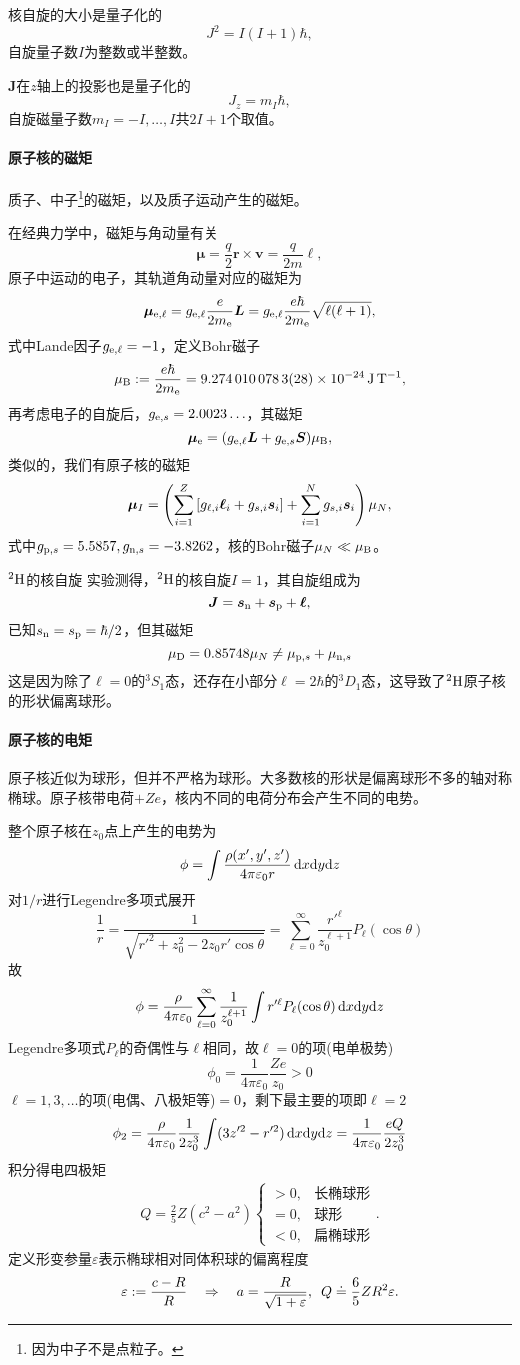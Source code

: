 核自旋的大小是量子化的
\[
	J^2=I(I+1)\hbar,
\]
自旋量子数$I$为整数或半整数。

$\bm J$在$z$轴上的投影也是量子化的
\[
	J_z=m_I\hbar,
\]
自旋磁量子数$m_I=-I,\ldots,I$共$2I+1$个取值。
\paragraph{原子核的磁矩}质子、中子\footnote{因为中子不是点粒子。}的磁矩，以及质子运动产生的磁矩。

在经典力学中，磁矩与角动量有关
\[
	\bm\mu=\frac{q}2\bm r\times\bm v=\frac{q}{2m}\bm\ell,
\]
原子中运动的电子，其轨道角动量对应的磁矩为
\[
	\bm\mu_{\elc,\ell}=g_{\elc,\ell}\frac{e}{2m_\elc}\bm L=g_{\elc,\ell}\frac{e\hbar}{2m_\elc}\sqrt{\ell(\ell+1)},
\]
式中Lande因子$g_{\elc,\ell}=-1$，定义Bohr磁子
\[
	\muB:=\frac{e\hbar}{2m_\elc}=\SI[separate-uncertainty = false]{9.2740100783(28)e-24}{J.T^{-1}},
\]
再考虑电子的自旋后，$g_{\elc,s}=2.0023\ldots$，其磁矩
\[
	\bm\mu_\elc=(g_{\elc,\ell}\bm L+g_{\elc,s}\bm S)\muB,
\]
类似的，我们有原子核的磁矩
\[
	\bm\mu_I=\kh{\sum_{i=1}^Z\fkh{g_{\ell,i}\bm\ell_i+g_{s,i}\bm s_i}+\sum_{i=1}^Ng_{s,i}\bm s_i}\mu_N,
\]
式中$g_{\pton,s}=5.5857,g_{\nton,s}=-3.8262$，核的Bohr磁子$\mu_N\ll\muB$。
\begin{example}{$\nucli2H$的核自旋}{}
	实验测得，$\nucli2H$的核自旋$I=1$，其自旋组成为
	\[
		\bm J=\bm s_\nton+\bm s_\pton+\bm\ell,
	\]
	已知$s_\nton=s_\pton=\hbar/2$，但其磁矩
	\[
		\mu_{\nuc D}=0.85748\mu_N\neq\mu_{\pton,s}+\mu_{\nton,s}
	\]
	这是因为除了$\ell=0$的$^3S_1$态，还存在小部分$\ell=2\hbar$的$^3D_1$态，这导致了$\nucli2H$原子核的形状偏离球形。
\end{example}
\paragraph{原子核的电矩}原子核近似为球形，但并不严格为球形。大多数核的形状是偏离球形不多的轴对称椭球。原子核带电荷$+Ze$，核内不同的电荷分布会产生不同的电势。

整个原子核在$z_0$点上产生的电势为
\[
	\phi=\int\frac{\rho(x',y',z')}{4\pi\varepsilon_0r}\d x\nd y\nd z
\]
对$1/r$进行Legendre多项式展开
\[
	\frac1r=\frac1{\sqrt{r'^2+z_0^2-2z_0r'\cos\theta}}=\sum_{\ell=0}^\infty \frac{r'^\ell}{z_0^{\ell+1}}P_\ell(\cos\theta)
\]
故
\[
	\phi=\frac\rho{4\pi\varepsilon_0}\sum_{\ell=0}^\infty\frac1{z_0^{\ell+1}}\int r'^\ell P_\ell(\cos\theta)\d x\nd y\nd z
\]
Legendre多项式$P_\ell$的奇偶性与$\ell$相同，故$\ell=0$的项(电单极势)
\[
	\phi_0=\frac1{4\pi\varepsilon_0}\frac{Ze}{z_0}>0
\]
$\ell=1,3,\ldots$的项(电偶、八极矩等)$=0$，剩下最主要的项即$\ell=2$
\[
	\phi_2=\frac\rho{4\pi\varepsilon_0}\frac1{2z_0^3}\int(3z'^2-r'^2)\d x\nd y\nd z=\frac1{4\pi\varepsilon_0}\frac{eQ}{2z_0^3}
\]
积分得电四极矩
\begin{align}
	Q=\frac25Z(c^2-a^2)\begin{cases}
		>0,&\text{长椭球形}\\
		=0,&\text{球形}\\
		<0,&\text{扁椭球形}
	\end{cases}.
\end{align}
定义形变参量$\varepsilon$表示椭球相对同体积球的偏离程度
\[
	\varepsilon:=\frac{c-R}R\thus a=\frac{R}{\sqrt{1+\varepsilon}},\enspace Q\doteq\frac65ZR^2\varepsilon.
\]

